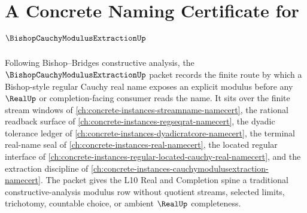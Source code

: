 \chapter{A Concrete Naming Certificate for $\BishopCauchyModulusExtractionUp$}
\label{ch:concrete-instances-bishop-cauchy-modulus-extraction-namecert}

Following Bishop--Bridges constructive analysis, the $\BishopCauchyModulusExtractionUp$ packet records the finite route by which a Bishop-style regular Cauchy real name exposes an explicit modulus before any $\RealUp$ or completion-facing consumer reads the name. It sits over the finite stream windows of \autoref{ch:concrete-instances-streamname-namecert}, the rational readback surface of \autoref{ch:concrete-instances-regseqrat-namecert}, the dyadic tolerance ledger of \autoref{ch:concrete-instances-dyadicratcore-namecert}, the terminal real-name seal of \autoref{ch:concrete-instances-real-namecert}, the located regular interface of \autoref{ch:concrete-instances-regular-located-cauchy-real-namecert}, and the extraction discipline of \autoref{ch:concrete-instances-cauchymodulusextraction-namecert}. The packet gives the L10 Real and Completion spine a traditional constructive-analysis modulus row without quotient streams, selected limits, trichotomy, countable choice, or ambient $\RealUp$ completeness.

